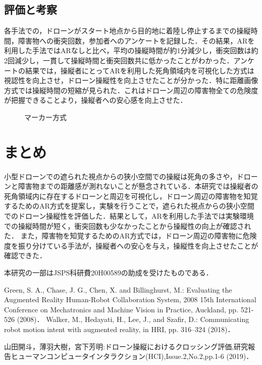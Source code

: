 \documentclass[a4j,10pt,twocolumn]{jarticle}
\begin{document}
\subsection{評価と考察}
各手法での，ドローンがスタート地点から目的地に着陸し停止するまでの操縦時間，障害物への衝突回数，参加者へのアンケートを記録した．その結果，ARを利用した手法ではARなしと比べ，平均の操縦時間が約1分減少し，衝突回数は約2回減少し，一貫して操縦時間と衝突回数共に低かったことがわかった．アンケートの結果では，操縦者にとってARを利用した死角領域内を可視化した方式は視認性を向上させ，ドローン操縦性を向上させたことが分かった．特に距離画像方式では操縦時間の短縮が見られた．これはドローン周辺の障害物全ての危険度が把握できることより，操縦者への安心感を向上させた．
\begin{figure}[tb]
\begin{center}
  \vspace{-2mm}
  \caption{マーカー方式}
  \label{fig:principle}
\end{center}
\end{figure}

\section{まとめ}
小型ドローンでの遮られた視点からの狭小空間での操縦は死角の多さや，ドローンと障害物までの距離感が測れないことが懸念されている．本研究では操縦者の死角領域内に存在するドローンと周辺を可視化し，ドローン周辺の障害物を知覚するためのAR方式を提案し，実験を行うことで，遮られた視点からの狭小空間でのドローン操縦性を評価した．結果として，ARを利用した手法では実験環境での操縦時間が短く，衝突回数も少なかったことから操縦性の向上が確認された．
また，障害物を知覚するためのAR方式では，ドローン周辺の障害物に危険度を振り分けている手法が，操縦者への安心を与え，操縦性を向上させたことが確認できた．

\vspace{10pt}
本研究の一部はJSPS科研費20H00589の助成を受けたものである．
{\footnotesize 

% 
% 

\begin{thebibliography}{99}
Green, S. A., Chase, J. G., Chen, X. and Billinghurst, M.: Evaluating the Augmented Reality Human-Robot Collaboration System, 2008 15th International Conference on Mechatronics and Machine Vision in Practice, Auckland, pp. 521-526 (2008)．
Walker, M., Hedayati, H., Lee, J., and Szafir, D.: Communicating robot
motion intent with augmented reality, in HRI, pp. 316–324 (2018)．

山田開斗，薄羽大樹，宮下芳明:ドローン操縦におけるクロッシング評価,研究報告ヒューマンコンピュータインタラクション(HCI),Issue.2,No.2,pp.1-6 (2019)．

\end{thebibliography}
}
\end{document}
